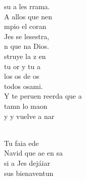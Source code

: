 \documentclass[12pt]{article}
\begin{document}
\begin{multicols*}{2}
\begin{cancion}
	su a les rrama. \\
	A allos que nen \\
	mpio el coran\\
	Jes se lesestra, \\
	n que na Dios.\\
	struye la z en \\
	tu or y tu a\\
	los os de os \\
	todos osami.  \\
	Y te peruen reerda que a \\
	tamn lo maon \\
	y y vuelve a nar\\\jump\\
	\begin{chorus}%
	Tu faia ede  \\
	Navid que ae en sa\\
	si a Jes dejáiar\\
	 sus bienaventun   \\
	\end{chorus}%
	\jump\\
\end{cancion}%


\end{multicols*}
\end{document}
